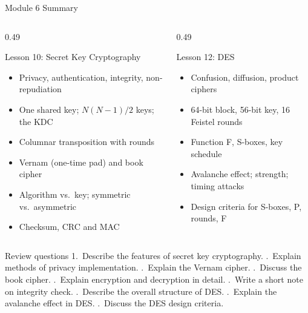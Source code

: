 \documentclass[aspectratio=169,11pt,xcolor={table}]{beamer}
\begin{document}
\begin{frame}{Module 6 Summary}
  \begin{columns}[T]
    \begin{column}{0.49\textwidth}
      \begin{block}{Lesson 10: Secret Key Cryptography}
        \small
        \begin{itemize}\setlength{\itemsep}{0pt}
          \item Privacy, authentication, integrity, non-repudiation
          \item One shared key; $N(N{-}1)/2$ keys; the KDC
          \item Columnar transposition with rounds
          \item Vernam (one-time pad) and book cipher
          \item Algorithm vs.\ key; symmetric vs.\ asymmetric
          \item Checksum, CRC and MAC
        \end{itemize}
      \end{block}
    \end{column}
    \begin{column}{0.49\textwidth}
      \begin{exampleblock}{Lesson 12: DES}
        \small
        \begin{itemize}\setlength{\itemsep}{0pt}
          \item Confusion, diffusion, product ciphers
          \item 64-bit block, 56-bit key, 16 Feistel rounds
          \item Function F, S-boxes, key schedule
          \item Avalanche effect; strength; timing attacks
          \item Design criteria for S-boxes, P, rounds, F
        \end{itemize}
      \end{exampleblock}
    \end{column}
  \end{columns}
  \vspace{1mm}
  \begin{alertblock}{Review questions}
    \scriptsize
    1.~Describe the features of secret key cryptography. .~Explain methods of privacy implementation. .~Explain the Vernam cipher. .~Discuss the book cipher. .~Explain encryption and decryption in detail. .~Write a short note on integrity check. .~Describe the overall structure of DES. .~Explain the avalanche effect in DES. .~Discuss the DES design criteria.
  \end{alertblock}
\end{frame}
\end{document}
